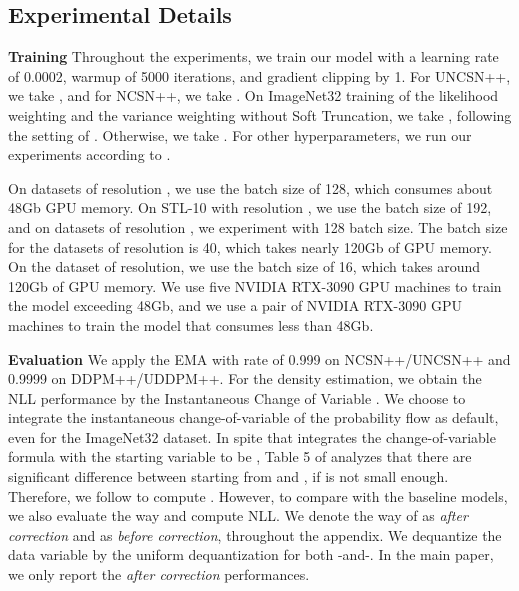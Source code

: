 \documentclass[nohyperref]{article}
\theoremstyle{plain}
\theoremstyle{definition}
\theoremstyle{remark}
\begin{document}
\subsection{Experimental Details}

	\textbf{Training} Throughout the experiments, we train our model with a learning rate of 0.0002, warmup of 5000 iterations, and gradient clipping by 1. For UNCSN++, we take , and for NCSN++, we take . On ImageNet32 training of the likelihood weighting and the variance weighting without Soft Truncation, we take , following the setting of \citet{song2021maximum}. Otherwise, we take . For other hyperparameters, we run our experiments according to \citet{song2020score,song2021maximum}.
	
	On datasets of resolution , we use the batch size of 128, which consumes about 48Gb GPU memory. On STL-10 with resolution , we use the batch size of 192, and on datasets of resolution , we experiment with 128 batch size. The batch size for the datasets of resolution  is 40, which takes nearly 120Gb of GPU memory. On the dataset of  resolution, we use the batch size of 16, which takes around 120Gb of GPU memory. We use five NVIDIA RTX-3090 GPU machines to train the model exceeding 48Gb, and we use a pair of NVIDIA RTX-3090 GPU machines to train the model that consumes less than 48Gb. 
	
	\textbf{Evaluation} We apply the EMA with rate of 0.999 on NCSN++/UNCSN++ and 0.9999 on DDPM++/UDDPM++. For the density estimation, we obtain the NLL performance by the Instantaneous Change of Variable \citep{song2020score, chen2018neural}. We choose  to integrate the instantaneous change-of-variable of the probability flow as default, even for the ImageNet32 dataset. In spite that \citet{song2020score, song2021maximum} integrates the change-of-variable formula with the starting variable to be , Table 5 of \citet{kim2022maximum} analyzes that there are significant difference between starting from  and , if  is not small enough. Therefore, we follow \citet{kim2022maximum} to compute . However, to compare with the baseline models, we also evaluate the way \citet{song2020score, song2021maximum} and \citet{vahdat2021score} compute NLL. We denote the way of \citet{kim2022maximum} as \textit{after correction} and \citet{song2021maximum} as \textit{before correction}, throughout the appendix. We dequantize the data variable by the uniform dequantization \cite{ho2019flow++} for both -and-. In the main paper, we only report the \textit{after correction} performances.
		
\end{document}
